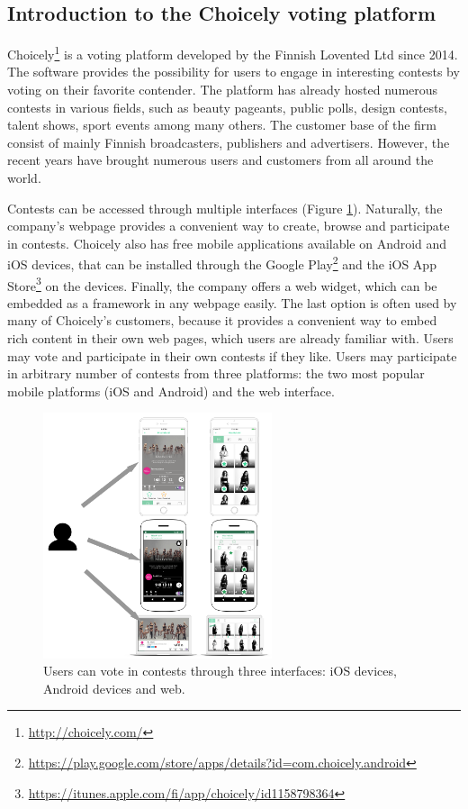 \subsection{Introduction to the Choicely voting platform}
    Choicely\footnote{\url{http://choicely.com/}} is a voting platform developed by the Finnish Lovented Ltd since 2014. The software provides the possibility for users to engage in interesting contests by voting on their favorite contender. The platform has already hosted numerous contests in various fields, such as beauty pageants, public polls, design contests, talent shows, sport events among many others. The customer base of the firm consist of mainly Finnish broadcasters, publishers and advertisers. However, the recent years have brought numerous users and customers from all around the world.

    Contests can be accessed through multiple interfaces (Figure \ref{choicely_platforms}). Naturally, the company's webpage provides a convenient way to create, browse and participate in contests. Choicely also has free mobile applications available on Android and iOS devices, that can be installed through the Google Play\footnote{\url{https://play.google.com/store/apps/details?id=com.choicely.android}} and the iOS App Store\footnote{\url{https://itunes.apple.com/fi/app/choicely/id1158798364}} on the devices. Finally, the company offers a web widget, which can be embedded as a framework in any webpage easily. The last option is often used by many of Choicely's customers, because it provides a convenient way to embed rich content in their own web pages, which users are already familiar with. Users may vote and participate in their own contests if they like. Users may participate in arbitrary number of contests from three platforms: the two most popular mobile platforms (iOS and Android) and the web interface. 

    \begin{figure}[h] 
        \begin{center}
            \includegraphics[width=0.6\textwidth]{images/choicely_platforms.png}
            \caption{Users can vote in contests through three interfaces: iOS devices, Android devices and web.}
            \label{choicely_platforms}
        \end{center}
    \end{figure}


